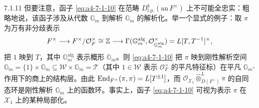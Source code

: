 \begin{rem}{7.1.11}\label{rem:a4-7-1-11}
但要注意，函子 \eqref{eq:a4-7-1-10} 在范畴 $D^b_{\mathrm{f.p.}}(\mathrm{an}\,F^\times)$ 上不可能全忠实：粗略地说，该函子涉及从代数 $\mathbb G_m$ 到解析 $\mathbb G_m$ 的解析化。举一个显式的例子：取 $\pi$ 为万有非分歧表示
\[
F^\times\longrightarrow F^\times/\mathcal O_F^\times\cong\mathbb{Z}\longrightarrow
\Gamma(\mathbb G_m^{\mathrm{alg}},\mathcal O^\times_{\mathbb G_m^{\mathrm{alg}}})=L[T,T^{-1}]^\times,
\]
把 $1$ 映到 $T$，其中 $\mathbb G_m^{\mathrm{alg}}$ 表示概形 $\mathbb G_m$。则 \eqref{eq:a4-7-1-10} 把 $\pi$ 映到刚性解析空间 $\mathbb G_m=\{1\}\times\mathbb G_m\subseteq\mathcal W\times\mathbb G_m=\mathcal T$（其中 $1\in\mathcal W$ 表示 $\mathcal O_F^\times$ 的平凡特征标）在平凡 $\mathbb G_m$-作用下的商上的结构层。由此 $\operatorname{End}_{F^\times}(\pi,\pi)=L[T^{\pm1}]$，而 $\mathcal O_{\mathcal X_1}\widehat\otimes^{L}_{D(F^\times)}\pi$ 的自同态环是刚性解析 $\mathbb G_m$ 上的函数环。事实上，函子 \eqref{eq:a4-7-1-10} 可视为表示 $\pi$ 在 $\mathcal X_1$ 上的某种局部化。
\end{rem}

